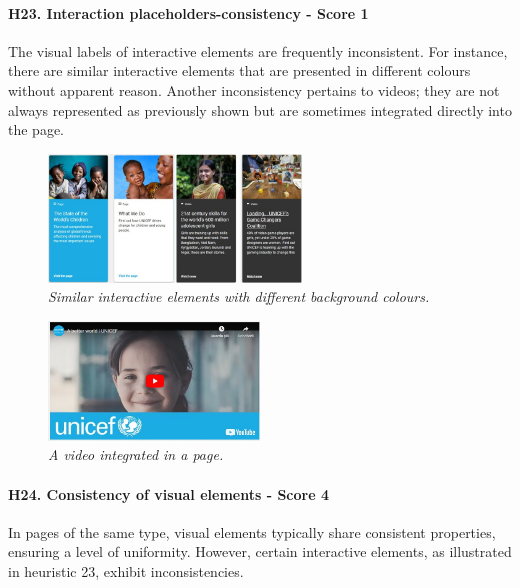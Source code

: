 \paragraph{H23. Interaction placeholders-consistency - Score 1}	The visual labels of interactive elements are frequently inconsistent. For instance, there are similar interactive elements that are presented in different colours without apparent reason. Another inconsistency pertains to videos; they are not always represented as previously shown but are sometimes integrated directly into the page.
\begin{figure}[!h]
	\begin{center}
		\includegraphics[width=0.6\textwidth]{Picture15.jpg}
		\captionsetup{font=small}
		\caption{\textit{Similar interactive elements with different background colours.}}
	\end{center}
\end{figure}
\begin{figure}[!h]
	\begin{center}
		\includegraphics[width=0.5\textwidth]{Picture16.jpg}
		\captionsetup{font=small}
		\caption{\textit{A video integrated in a page.}}
	\end{center}
\end{figure}
\newline
\paragraph{H24. Consistency of visual elements - Score 4}	In pages of the same type, visual elements typically share consistent properties, ensuring a level of uniformity. However, certain interactive elements, as illustrated in heuristic 23, exhibit inconsistencies.
\newline
